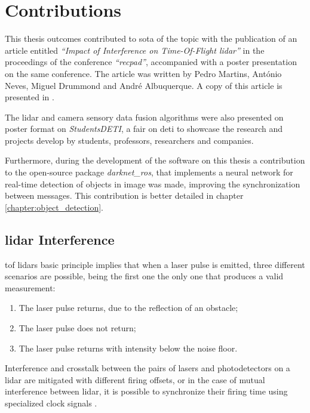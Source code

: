 \section{Contributions} \label{section:introduction:contributions}
This thesis outcomes contributed to \acl{sota} of the topic with the publication of an article entitled \textit{``Impact of Interference on Time-Of-Flight \acs{lidar}''} in the proceedings of the conference \textit{``\acl{recpad}''}, accompanied with a poster presentation on the same conference. The article was written by Pedro Martins, António Neves, Miguel Drummond and André Albuquerque. A copy of this article is presented in .

The \ac{lidar} and camera sensory data fusion algorithms were also presented on poster format on \textit{Students\@ DETI}, a fair on  \acl{deti} to showcase the research and projects develop by students, professors, researchers and companies.

Furthermore, during the development of the software on this thesis a contribution to the open-source package \textit{darknet\_ros}, that implements a neural network for real-time detection of objects in image was made, improving the synchronization between messages. This contribution is better detailed in chapter \ref{chapter:object_detection}.


\subsection{\ac{lidar} Interference}
\ac{tof} \ac{lidar}s basic principle implies that when a laser pulse is emitted, three different scenarios are possible, being the first one the only one that produces a valid measurement:
\begin{enumerate}
    \itemsep0em
    \item The laser pulse returns, due to the reflection of an obstacle;
    \item The laser pulse does not return;
    \item The laser pulse returns with intensity below the noise floor.
\end{enumerate}

Interference and crosstalk between the pairs of lasers and photodetectors on a \ac{lidar} are mitigated with different firing offsets, or in the case of mutual interference between \ac{lidar}, it is possible to synchronize their firing time using specialized clock signals \cite{vlp16}.

